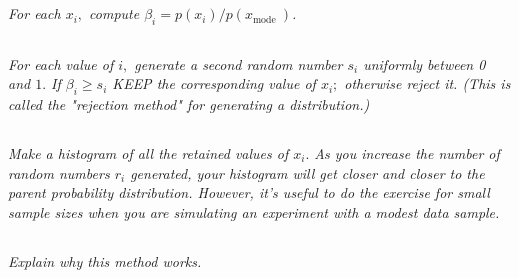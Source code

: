 \documentclass{article}
\begin{document}
\subsection{}
\textit{For each $x_{i},$ compute $\beta_{i}=p\left(x_{i}\right) / p\left(x_{\text {mode }}\right)$.}


\subsection{}
\textit{For each value of $i,$ generate a second random number $s_{i}$ uniformly between 0 and $1 .$ If $\beta_{i} \geq s_{i}$ KEEP the corresponding value of $x_{i} ;$ otherwise reject it. (This is called the "rejection method" for generating a distribution.)}



\subsection{}
\textit{Make a histogram of all the retained values of $x_{i} .$ As you increase the number of random numbers $r_{i}$ generated, your histogram will get closer and closer to the parent probability distribution. However, it's useful to do the exercise for small sample sizes when you are simulating an experiment with a modest data sample.}


\subsection{}
\textit{Explain why this method works.}
\end{document}
